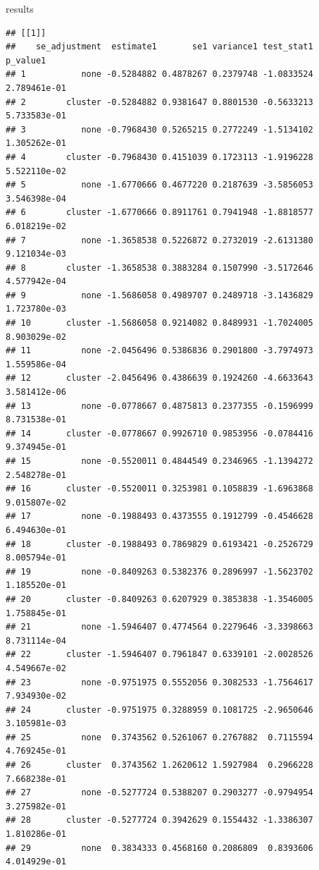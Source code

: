 \documentclass[
]{article}
\newenvironment{Shaded}{\begin{snugshade}}{\end{snugshade}}
\newcommand{\NormalTok}[1]{#1}
\begin{document}
\begin{Shaded}
\begin{Highlighting}[]
\NormalTok{results}
\end{Highlighting}
\end{Shaded}

\begin{verbatim}
## [[1]]
##    se_adjustment  estimate1       se1 variance1 test_stat1     p_value1
## 1           none -0.5284882 0.4878267 0.2379748 -1.0833524 2.789461e-01
## 2        cluster -0.5284882 0.9381647 0.8801530 -0.5633213 5.733583e-01
## 3           none -0.7968430 0.5265215 0.2772249 -1.5134102 1.305262e-01
## 4        cluster -0.7968430 0.4151039 0.1723113 -1.9196228 5.522110e-02
## 5           none -1.6770666 0.4677220 0.2187639 -3.5856053 3.546398e-04
## 6        cluster -1.6770666 0.8911761 0.7941948 -1.8818577 6.018219e-02
## 7           none -1.3658538 0.5226872 0.2732019 -2.6131380 9.121034e-03
## 8        cluster -1.3658538 0.3883284 0.1507990 -3.5172646 4.577942e-04
## 9           none -1.5686058 0.4989707 0.2489718 -3.1436829 1.723780e-03
## 10       cluster -1.5686058 0.9214082 0.8489931 -1.7024005 8.903029e-02
## 11          none -2.0456496 0.5386836 0.2901800 -3.7974973 1.559586e-04
## 12       cluster -2.0456496 0.4386639 0.1924260 -4.6633643 3.581412e-06
## 13          none -0.0778667 0.4875813 0.2377355 -0.1596999 8.731538e-01
## 14       cluster -0.0778667 0.9926710 0.9853956 -0.0784416 9.374945e-01
## 15          none -0.5520011 0.4844549 0.2346965 -1.1394272 2.548278e-01
## 16       cluster -0.5520011 0.3253981 0.1058839 -1.6963868 9.015807e-02
## 17          none -0.1988493 0.4373555 0.1912799 -0.4546628 6.494630e-01
## 18       cluster -0.1988493 0.7869829 0.6193421 -0.2526729 8.005794e-01
## 19          none -0.8409263 0.5382376 0.2896997 -1.5623702 1.185520e-01
## 20       cluster -0.8409263 0.6207929 0.3853838 -1.3546005 1.758845e-01
## 21          none -1.5946407 0.4774564 0.2279646 -3.3398663 8.731114e-04
## 22       cluster -1.5946407 0.7961847 0.6339101 -2.0028526 4.549667e-02
## 23          none -0.9751975 0.5552056 0.3082533 -1.7564617 7.934930e-02
## 24       cluster -0.9751975 0.3288959 0.1081725 -2.9650646 3.105981e-03
## 25          none  0.3743562 0.5261067 0.2767882  0.7115594 4.769245e-01
## 26       cluster  0.3743562 1.2620612 1.5927984  0.2966228 7.668238e-01
## 27          none -0.5277724 0.5388207 0.2903277 -0.9794954 3.275982e-01
## 28       cluster -0.5277724 0.3942629 0.1554432 -1.3386307 1.810286e-01
## 29          none  0.3834333 0.4568160 0.2086809  0.8393606 4.014929e-01

\end{verbatim}
\end{document}
